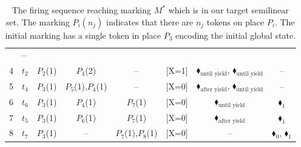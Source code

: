 \begin{table}[!htbp]
\begin{tabular}{c l c c c c c c}
		& --                                    \\
		4 & $t_2$                                  
		& {\color{blue}$P_2$(1)}                  
		& $P_4$(2)                                
		& --                                    
		&                                    {\color{blue}[X=1]}    
		&                                    {\color{black}$\blacklozenge_\text{until yield}$}, {\color{black}$\blacklozenge_\text{until yield}$}   
		& --                                    \\
		5 & $t_4$                                  
		& {\color{blue}$P_3$(1)}                  
		& $P_5$(1),$P_4$(1)                          
		& --                                    
		&                                   {\color{blue}[X=0]}     
		&                                    {\color{black}$\blacklozenge_\text{after yield}$}, {\color{black}$\blacklozenge_\text{until yield}$}   
		& --                                    \\
		6 & $t_6$                     
		& {\color{blue}$P_3$(1)}                  
		& $P_4$(1)                                
		& {\color{red}$P_7$(1)}                    
		&                                      	{\color{blue}[X=0]}  
		&                                    {\color{black}$\blacklozenge_\text{until yield}$}   
		&                                   {\color{red}$\blacklozenge_1$}     \\
		7 & $t_5$                                  
		& {\color{blue}$P_3$(1)}                  
		& $P_6$(1)                                
		& {\color{red}$P_7$(1)}                    
		&                                   {\color{blue}[X=0]}    
		&                                    {\color{black}$\blacklozenge_\text{after yield}$}      
		&                                   {\color{red}$\blacklozenge_1$}        \\
		8 & $t_7$                     
		& {\color{blue}$P_3$(1)}                                  
		& --                                    
		& {\color{red}$P_7$(1),\color{red}$P_8$(1)}    
		&                                   {\color{blue}[X=0]}    
		&                                   --    
		&                                   {\color{red}$\blacklozenge_0$}, {\color{red}$\blacklozenge_1$}       \\
		\bottomrule
	\end{tabular}
	\caption{The firing sequence reaching marking $M^*$ which is in our target semilinear set. The marking $P_i(n_j)$ indicates that there are $n_j$ tokens on place $P_i$. The initial marking has a single token in place $P_3$ encoding the initial global state.}
	\label{tab:PetriNetFiringCounterexample}
\end{table}

